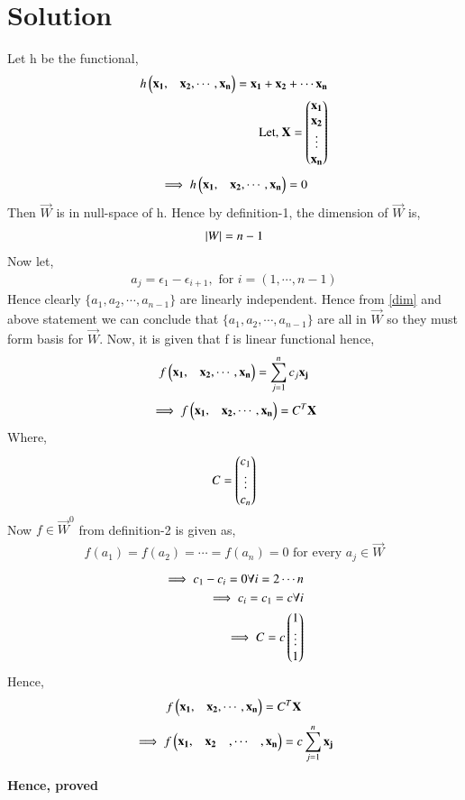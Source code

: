 \documentclass[journal,12pt,twocolumn]{IEEEtran}
\begin{document}
\section{Solution}
Let h be the functional,
\begin{align}
h\begin{pmatrix}\mathbf{x_1},&\mathbf{x_2},\cdots ,\mathbf{x_n}\end{pmatrix} = \mathbf{x_1}+\mathbf{x_2}+\cdots \mathbf{x_n}\\
\mbox{Let, } \mathbf{X} = \begin{pmatrix}\mathbf{x_1}\\\mathbf{x_2}\\\vdots\\\mathbf{x_n}\end{pmatrix}
\end{align}
\begin{align}
\implies h\begin{pmatrix}\mathbf{x_1},&\mathbf{x_2},\cdots ,\mathbf{x_n}\end{pmatrix} = 0
\end{align}
Then $\vec{W}$ is in null-space of h. Hence by definition-1, the dimension of $\vec{W}$ is,
\begin{align}
\left\vert W\right\vert = n - 1
\label{dim}
\end{align}
Now let, 
\begin{align}
a_j = \epsilon_1-\epsilon_{i+1}, \mbox{ for } i = (1,\cdots ,n-1)
\label{aj} 
\end{align}
Hence clearly $\{a_1, a_2, \cdots, a_{n-1}\}$ are linearly independent. Hence from \eqref{dim} and above statement we can conclude that $\{a_1, a_2, \cdots, a_{n-1}\}$ are all in $\vec{W}$ so they must form basis for $\vec{W}$. Now, it is given that f is linear functional hence,
\begin{align}
f\begin{pmatrix}\mathbf{x_1},&\mathbf{x_2},\cdots ,\mathbf{x_n}\end{pmatrix} = \sum_{j=1}^{n}c_j\mathbf{x_j}
\end{align}
\begin{align}
\implies f\begin{pmatrix}\mathbf{x_1},&\mathbf{x_2},\cdots ,\mathbf{x_n}\end{pmatrix} = C^T\mathbf{X}
\end{align}
Where,
\begin{align}
C = \begin{pmatrix}c_1\\\vdots\\c_n\end{pmatrix}
\end{align}
Now $f \in \vec{W}^0$ from definition-2 is given as,
\begin{align}
f(a_1) = f(a_2) = \cdots = f(a_n) = 0 \mbox{ for every } a_j \in \vec{W}
\end{align}
\begin{align}
\implies c_1 - c_i = 0 \forall i= 2\cdots n\\
\implies c_i = c_1 = c \forall i\\
\implies C = c\begin{pmatrix}1\\\vdots\\1\end{pmatrix}
\end{align}
Hence,
\begin{align}
f\begin{pmatrix}\mathbf{x_1},&\mathbf{x_2},\cdots ,\mathbf{x_n}\end{pmatrix} = C^T\mathbf{X}
\end{align}
\begin{align}
\implies f\begin{pmatrix}\mathbf{x_1},&\mathbf{x_2}&,\cdots &,\mathbf{x_n}\end{pmatrix} = c\sum_{j=1}^{n}\mathbf{x_j}
\end{align}
\begin{center}
\textbf{Hence, proved}
\end{center}
\end{document}
